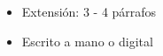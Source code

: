 \documentclass[11pt,fleqn,twocolumn]{book} %
\begin{document}
\begin{itemize}
\item Extensión: 3 - 4 párrafos
\item Escrito a mano o digital
\end{itemize}

\end{document}
